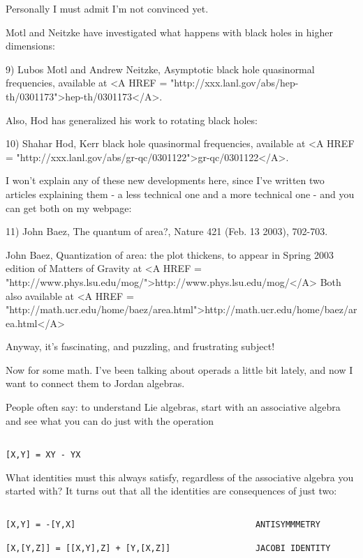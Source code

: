 Personally I must admit I'm not convinced yet.  

Motl and Neitzke have investigated what happens with black holes in
higher dimensions:

9) Lubos Motl and Andrew Neitzke, Asymptotic black hole quasinormal 
frequencies, available at <A HREF = "http://xxx.lanl.gov/abs/hep-th/0301173">hep-th/0301173</A>.

Also, Hod has generalized his work to rotating black holes:

10) Shahar Hod, Kerr black hole quasinormal frequencies, 
available at <A HREF = "http://xxx.lanl.gov/abs/gr-qc/0301122">gr-qc/0301122</A>.

I won't explain any of these new developments here, since I've written
two articles explaining them - a less technical one and a more technical
one - and you can get both on my webpage:

11) John Baez, The quantum of area?, Nature 421 (Feb. 13 2003), 702-703.
   
John Baez, Quantization of area: the plot thickens, to appear in 
Spring 2003 edition of Matters of Gravity at <A HREF = "http://www.phys.lsu.edu/mog/">http://www.phys.lsu.edu/mog/</A>
Both also available at <A HREF = "http://math.ucr.edu/home/baez/area.html">http://math.ucr.edu/home/baez/area.html</A>

Anyway, it's fascinating, and puzzling, and frustrating subject!

Now for some math.  I've been talking about operads a little
bit lately, and now I want to connect them to Jordan algebras.  

People often say: to understand Lie algebras, start with an associative
algebra and see what you can do just with the operation


\begin{verbatim}

[X,Y] = XY - YX 
\end{verbatim}
    
What identities must this always satisfy, regardless of the associative 
algebra you started with?  It turns out that all the identities are 
consequences of just two:


\begin{verbatim}

[X,Y] = -[Y,X]                                    ANTISYMMMETRY

[X,[Y,Z]] = [[X,Y],Z] + [Y,[X,Z]]                 JACOBI IDENTITY
\end{verbatim}
    

